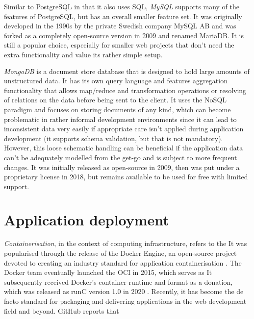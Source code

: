 Similar to PostgreSQL in that it also uses \ac{SQL}, \emph{MySQL} supports many of the features of PostgreSQL, but has an overall smaller feature set. It was originally developed in the 1990s by the private Swedish company MySQL AB and was forked as a completely open-source version in 2009 and renamed MariaDB. It is still a popular choice, especially for smaller web projects that don't need the extra functionality and value its rather simple setup.

\emph{MongoDB} is a document store database that is designed to hold large amounts of unstructured data. It has its own query language and features aggregation functionality that allows map/reduce and transformation operations or resolving of relations on the data before being sent to the client. It uses the \ac{NoSQL} paradigm and focuses on storing documents of any kind, which can become problematic in rather informal development environments since it can lead to inconsistent data very easily if appropriate care isn't applied during application development (it supports schema validation, but that is not mandatory). However, this loose schematic handling can be beneficial if the application data can't be adequately modelled from the get-go and is subject to more frequent changes. It was initially released as open-source in 2009, then was put under a proprietary license in 2018, but remains available to be used for free with limited support.


\section{Application deployment}

\emph{Containerisation}, in the context of computing infrastructure, refers to the  It was popularised through the release of the Docker Engine, an open-source project devoted to creating an industry standard for application containerisation \parencite{dockerRelease}. The Docker team eventually launched the \ac{OCI} in 2015, which serves as  It subsequently received Docker's container runtime and format as a donation, which was released as runC version 1.0 in 2020 \parencite{openContainerInitiative}. Recently, it has become the de facto standard for packaging and delivering applications in the web development field and beyond. GitHub reports that 

